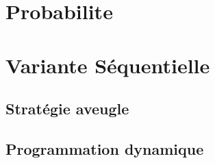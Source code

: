 \documentclass{report}
\begin{document}
  {\let\clearpage\relax \chapter{Probabilite}}   %
  {\let\clearpage\relax \chapter{Variante Séquentielle}} 
  \section{Stratégie aveugle}
  \section{Programmation dynamique}
  \paragraph{}
\end{document}
